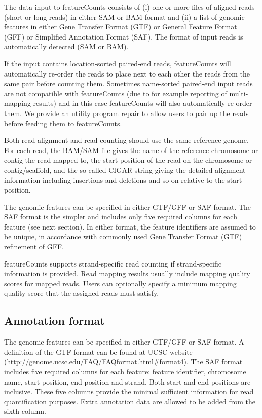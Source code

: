 \documentclass[12pt]{report}
\newcommand{\featureCounts}{\textsf{featureCounts}}
\newcommand{\repair}{\textsf{repair}}
\begin{document}
The data input to {\featureCounts} consists of (i) one or more files of aligned reads (short or long reads) in either SAM or BAM format and (ii) a list of genomic features in either Gene Transfer Format (GTF) or General Feature Format (GFF) or Simplified Annotation Format (SAF). The format of input reads is automatically detected (SAM or BAM).

If the input contains location-sorted paired-end reads, {\featureCounts} will automatically re-order the reads to place next to each other the reads from the same pair before counting them.
Sometimes name-sorted paired-end input reads are not compatible with featureCounts (due to for example reporting of multi-mapping results) and in this case {\featureCounts} will also automatically re-order them.
We provide an utility program {\repair} to allow users to pair up the reads before feeding them to {\featureCounts}.

Both read alignment and read counting should use the same reference genome. For each read, the BAM/SAM file gives the name of the reference chromosome or contig the read mapped to, the start position of the read on the chromosome or contig/scaffold, and the so-called CIGAR string giving the detailed alignment information including insertions and deletions and so on relative to the start position.

The genomic features can be specified in either GTF/GFF or SAF format. The SAF format is the simpler and includes only five required columns for each feature (see next section). In either format, the feature identifiers are assumed to be unique, in accordance with commonly used Gene Transfer Format (GTF) refinement of GFF.

{\featureCounts} supports strand-specific read counting if strand-specific information is provided. Read mapping results usually include mapping quality scores for mapped reads. Users can optionally specify a minimum mapping quality score that the assigned reads must satisfy.

\subsection{Annotation format}
\label{sec:annotation}

The genomic features can be specified in either GTF/GFF or SAF format.
A definition of the GTF format can be found at UCSC website (\url{http://genome.ucsc.edu/FAQ/FAQformat.html#format4}).
The SAF format includes five required columns for each feature: feature identifier, chromosome name, start position, end position and strand.
Both start and end positions are inclusive.
These five columns provide the minimal sufficient information for read quantification purposes.
Extra annotation data are allowed to be added from the sixth column. 
\end{document}
